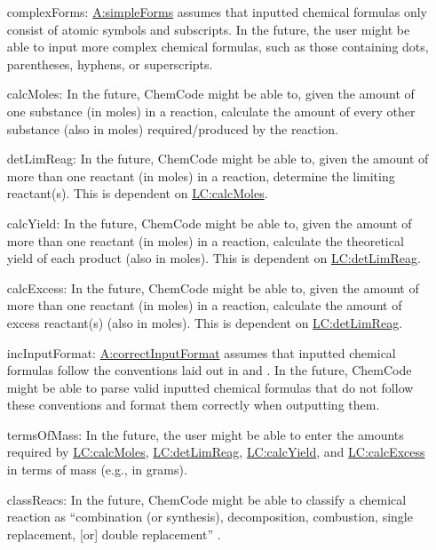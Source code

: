 \documentclass[12pt]{article}
\begin{document}
\begin{itemize}
\item[complexForms:\phantomsection\label{complexForms}]{\hyperref[simpleForms]{A:simpleForms} assumes that inputted chemical formulas only consist of atomic symbols and subscripts. In the future, the user might be able to input more complex chemical formulas, such as those containing dots, parentheses, hyphens, or superscripts.}
\item[calcMoles:\phantomsection\label{calcMoles}]{In the future, ChemCode might be able to, given the amount of one substance (in moles) in a reaction, calculate the amount of every other substance (also in moles) required/produced by the reaction.}
\item[detLimReag:\phantomsection\label{detLimReag}]{In the future, ChemCode might be able to, given the amount of more than one reactant (in moles) in a reaction, determine the limiting reactant(s). This is dependent on \hyperref[calcMoles]{LC:calcMoles}.}
\item[calcYield:\phantomsection\label{calcYield}]{In the future, ChemCode might be able to, given the amount of more than one reactant (in moles) in a reaction, calculate the theoretical yield of each product (also in moles). This is dependent on \hyperref[detLimReag]{LC:detLimReag}.}
\item[calcExcess:\phantomsection\label{calcExcess}]{In the future, ChemCode might be able to, given the amount of more than one reactant (in moles) in a reaction, calculate the amount of excess reactant(s) (also in moles). This is dependent on \hyperref[detLimReag]{LC:detLimReag}.}
\item[incInputFormat:\phantomsection\label{incInputFormat}]{\hyperref[correctInputFormat]{A:correctInputFormat} assumes that inputted chemical formulas follow the conventions laid out in \cite{inorganicIUPAC} and \cite{organicIUPAC}. In the future, ChemCode might be able to parse valid inputted chemical formulas that do not follow these conventions and format them correctly when outputting them.}
\item[termsOfMass:\phantomsection\label{termsOfMass}]{In the future, the user might be able to enter the amounts required by \hyperref[calcMoles]{LC:calcMoles}, \hyperref[detLimReag]{LC:detLimReag}, \hyperref[calcYield]{LC:calcYield}, and \hyperref[calcExcess]{LC:calcExcess} in terms of mass (e.g., in grams).}
\item[classReacs:\phantomsection\label{classReacs}]{In the future, ChemCode might be able to classify a chemical reaction as ``combination (or synthesis), decomposition, combustion, single replacement, [or] double replacement'' \cite[(pg. 301)]{lund2023}.}

\end{itemize}
\end{document}
